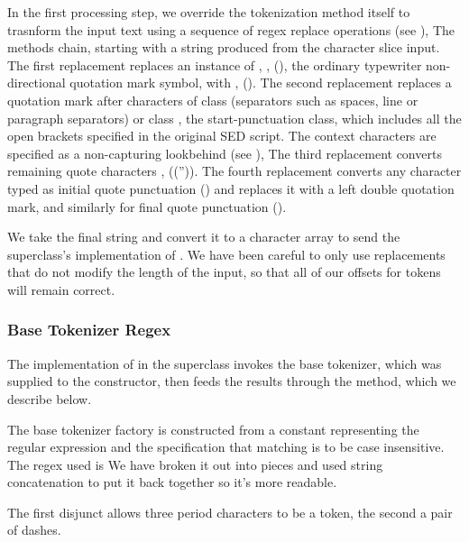 In the first processing step, we override the tokenization method
itself to trasnform the input text using a sequence of regex replace
operations (see ),
%
%
The  methods chain, starting with a string produced
from the character slice input.  The first replacement replaces an
instance of , , (),
the ordinary typewriter non-directional quotation mark symbol, with 
,  ().
The second replacement replaces a quotation mark after characters of
class  (separators such as spaces, line or paragraph
separators) or class , the start-punctuation class, which
includes all the open brackets specified in the original SED script.
The context characters are specified as a non-capturing lookbehind
(see ), The third replacement converts
remaining quote characters
, 
(\charmention({}'')).  The fourth replacement converts any character
typed as initial quote punctuation () and replaces it with a
left double quotation mark, and similarly for final quote punctuation
().  

We take the final string and convert it to a character array to send
the superclass's implementation of .  We have been
careful to only use replacements that do not modify the length of the
input, so that all of our offsets for tokens will remain correct.  


\subsubsection{Base Tokenizer Regex}

The implementation of  in the superclass
 invokes the base
tokenizer, which was supplied to the constructor, then feeds the
results through the  method, which we describe
below.

The base tokenizer factory is constructed from a constant representing
the regular expression and the specification that matching is to
be case insensitive.  The regex used is
%
%
We have broken it out into pieces and used string concatenation to put
it back together so it's more readable.  

The first disjunct allows three period characters to be a token, the
second a pair of dashes.  

